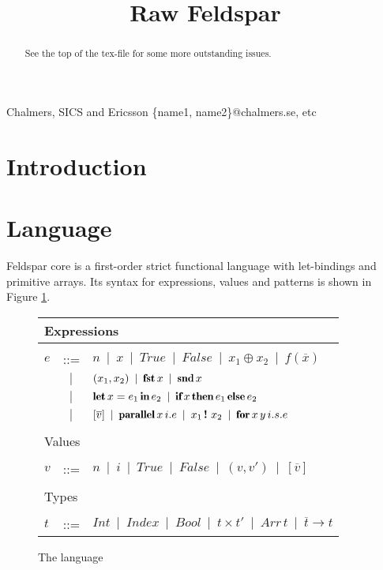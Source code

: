 \documentclass[natbib]{sigplanconf}
\newcommand{\kw}[1]{\mbox{\fontfamily{cmr}\fontseries{b}\selectfont#1}}
\newcommand{\alt}{\;\:\vert\;\:}
\newcommand{\IF}{\kw{if}\,}
\newcommand{\THEN}{\,\kw{then}\,}
\newcommand{\ELSE}{\,\kw{else}\,}
\newcommand{\LET}{\kw{let}\,}
\newcommand{\IN}{\,\kw{in}\,}
\newcommand{\PARALLEL}{\kw{parallel}\,}
\newcommand{\FOR}{\kw{for}\,}
\newcommand{\INDEX}{\,\kw{!}\,\,}
\newcommand{\FST}{\kw{fst}\,}
\newcommand{\SND}{\kw{snd}\,}
\newcommand{\TRUE}{True}
\newcommand{\FALSE}{False}
\newcommand{\ARRAY}[1]{[#1]}
\newcommand{\PAIR}[2]{(#1, #2)}
\newcommand{\TINDEX}{Index}
\newcommand{\TINT}{Int}
\newcommand{\TBOOL}{Bool}
\newcommand{\TPAIR}[2]{#1 \times #2}
\newcommand{\TARRAY}{Arr\,}
\newcommand{\TFUN}{\rightarrow}
\begin{document}




\title{Raw Feldspar}

           {Chalmers, SICS and Ericsson}
           {\{name1, name2\}@chalmers.se, etc}

\maketitle

\begin{abstract}
See the top of the tex-file for some more outstanding issues.
\end{abstract}

\section{Introduction}

\section{Language}
\label{sec:lang}

Feldspar core is a first-order strict functional language 
with let-bindings and primitive arrays. Its syntax for expressions,
values and patterns is shown in Figure \ref{fig:language}.

\begin{figure}
\begin{tabular}{lll}
\multicolumn{3}{l}{Expressions} \\ \hline \\
  $e$ &::= & $n \alt x \alt \TRUE \alt \FALSE  \alt x_1
      \oplus  x_2
      \alt  f(\overline{x})$ \\
 &  $\alt$ & $(x_1, x_2) \alt \FST x \alt \SND x$ \\ 
 &  $\alt$ & $\LET x = e_1 \IN e_2 \alt \IF x \THEN e_1 \ELSE e_2$ \\ 
 &  $\alt$ & $\ARRAY{\overline{v}} \alt \PARALLEL x\, i.e \alt x_1 \INDEX x_2 \alt
              \FOR x\, y\, i.s.e$\\
\\
\multicolumn{3}{l}{Values} \\ \hline \\
  $v$ &::= & $n  \alt i \alt \TRUE \alt \FALSE \alt \PAIR{v}{v'} \alt \ARRAY{\overline{v}}$ \\
\\
\multicolumn{3}{l}{Types} \\ \hline \\
  $t$ &::= & $\TINT \alt \TINDEX \alt \TBOOL \alt \TPAIR{t}{t'}  \alt \TARRAY t \alt \overline{t} \TFUN t$ \\
\end{tabular}  
\caption{The language}
\label{fig:language}
\end{figure}
\end{document}
